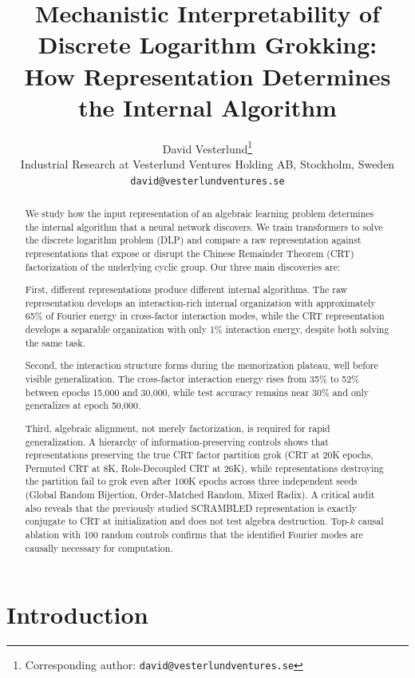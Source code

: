 \documentclass[11pt,a4paper]{article}
\title{Mechanistic Interpretability of Discrete Logarithm Grokking: \\
How Representation Determines the Internal Algorithm}
\author{David Vesterlund\thanks{Corresponding author: \texttt{david@vesterlundventures.se}} \\
Industrial Research at Vesterlund Ventures Holding AB, Stockholm, Sweden \\
\texttt{david@vesterlundventures.se}}
\theoremstyle{definition}
\theoremstyle{remark}
\begin{document}
\maketitle

\begin{abstract}
We study how the input representation of an algebraic learning problem determines the internal algorithm that a neural network discovers. We train transformers to solve the discrete logarithm problem (DLP) and compare a raw representation against representations that expose or disrupt the Chinese Remainder Theorem (CRT) factorization of the underlying cyclic group. Our three main discoveries are:

First, different representations produce different internal algorithms. The raw representation develops an interaction-rich internal organization with approximately 65\% of Fourier energy in cross-factor interaction modes, while the CRT representation develops a separable organization with only 1\% interaction energy, despite both solving the same task.

Second, the interaction structure forms during the memorization plateau, well before visible generalization. The cross-factor interaction energy rises from 35\% to 52\% between epochs 15,000 and 30,000, while test accuracy remains near 30\% and only generalizes at epoch 50,000.

Third, algebraic alignment, not merely factorization, is required for rapid generalization. A hierarchy of information-preserving controls shows that representations preserving the true CRT factor partition grok (CRT at 20K epochs, Permuted CRT at 8K, Role-Decoupled CRT at 26K), while representations destroying the partition fail to grok even after 100K epochs across three independent seeds (Global Random Bijection, Order-Matched Random, Mixed Radix). A critical audit also reveals that the previously studied SCRAMBLED representation is exactly conjugate to CRT at initialization and does not test algebra destruction. Top-$k$ causal ablation with 100 random controls confirms that the identified Fourier modes are causally necessary for computation.
\end{abstract}

\section{Introduction}
\end{document}
